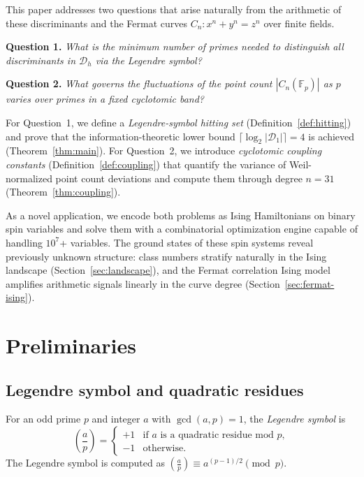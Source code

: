 \documentclass[11pt]{amsart}
\theoremstyle{definition}
\begin{document}
This paper addresses two questions that arise naturally from the arithmetic of these discriminants and the Fermat curves $C_n: x^n + y^n = z^n$ over finite fields.

\medskip
\noindent\textbf{Question 1.} \emph{What is the minimum number of primes needed to distinguish all discriminants in $\mathcal{D}_h$ via the Legendre symbol?}

\medskip
\noindent\textbf{Question 2.} \emph{What governs the fluctuations of the point count $|C_n(\mathbb{F}_p)|$ as $p$ varies over primes in a fixed cyclotomic band?}

\medskip

For Question~1, we define a \emph{Legendre-symbol hitting set} (Definition~\ref{def:hitting}) and prove that the information-theoretic lower bound $\lceil \log_2 |\mathcal{D}_1| \rceil = 4$ is achieved (Theorem~\ref{thm:main}). For Question~2, we introduce \emph{cyclotomic coupling constants} (Definition~\ref{def:coupling}) that quantify the variance of Weil-normalized point count deviations and compute them through degree $n = 31$ (Theorem~\ref{thm:coupling}).

As a novel application, we encode both problems as Ising Hamiltonians on binary spin variables and solve them with a combinatorial optimization engine capable of handling $10^7$+ variables. The ground states of these spin systems reveal previously unknown structure: class numbers stratify naturally in the Ising landscape (Section~\ref{sec:landscape}), and the Fermat correlation Ising model amplifies arithmetic signals linearly in the curve degree (Section~\ref{sec:fermat-ising}).


\section{Preliminaries}
\label{sec:prelim}

\subsection{Legendre symbol and quadratic residues}

For an odd prime $p$ and integer $a$ with $\gcd(a, p) = 1$, the \emph{Legendre symbol} is
\[
\left(\frac{a}{p}\right) = \begin{cases} +1 & \text{if } a \text{ is a quadratic residue mod } p, \\ -1 & \text{otherwise.} \end{cases}
\]
The Legendre symbol is computed as $\left(\frac{a}{p}\right) \equiv a^{(p-1)/2} \pmod{p}$.
\end{document}

